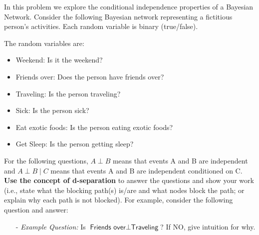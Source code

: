 \documentclass[submit]{../harvardml}
\newcommand{\attr}[1]{\textsf{#1}}
\begin{document}
\newpage

\begin{problem}
  In this problem we explore the conditional independence
  properties of a Bayesian Network.  Consider the following Bayesian
  network representing a fictitious person's activities. Each random
  variable is binary (true/false).

  \begin{center}
  \end{center}

  The random variables are:

  \begin{itemize}
  \item \attr{Weekend}: Is it the weekend?
  \item \attr{Friends over}: Does the person have friends over?
  \item \attr{Traveling}: Is the person traveling?
  \item \attr{Sick}: Is the person sick?
  \item \attr{Eat exotic foods}: Is the person eating exotic foods?
  \item \attr{Get Sleep}: Is the person getting sleep?
  \end{itemize}

  \medskip

  \noindent For the following questions, $A \perp B$ means that events A and B are independent and $A \perp B\mid C$ means that events A and B are independent conditioned on C. \\

  \noindent \textbf{Use the concept of d-separation} to answer the
  questions and show your work (i.e., state what the blocking path(s) is/are and what nodes block the path; or explain why each path is not blocked). For example, consider the following question and answer:
  \begin{itemize}
    \item[-] \textit{Example Question:} Is $\attr{Friends over} \perp \attr{Traveling}$? If NO, give intuition for why.
  

\end{itemize}
\end{problem}
\end{document}
